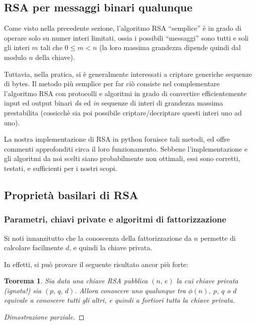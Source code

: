 \documentclass[pdflatex,11pt,a4paper,oneside]{article}
\let\OldEmph\emph
\renewcommand{\emph}[1]{\OldEmph{#1\/}}
\newcommand{\XXX}[1][XXX]{\text{\bfseries{\color{red}{\emph{#1}}}}}
\newcommand{\TODO}[0]{\XXX[TODO]}
\newcommand{\p}[1]{\left({#1}\right)}
\newcommand{\ephi}[1]{\ensuremath{\phi\p{#1}}}
\newtheorem{theorem}[TheoremLike]{Teorema}
\begin{document}
\subsection{RSA per messaggi binari qualunque}

Come visto nella precedente sezione, l'algoritmo RSA ``semplice'' \`e
in grado di operare solo su numer interi limitati, ossia i possibili
``messaggi'' sono tutti e soli gli interi $m$ tali che $0 \leq m < n$
(la loro massima grandezza dipende quindi dal modulo $n$ della chiave).

Tuttavia, nella pratica, si \`e generalmente interessati a criptare
generiche sequenze di bytes.  Il metodo pi\`u semplice per far ci\`o
consiste nel complementare l'algoritmo RSA con protocolli e algoritmi
in grado di convertire efficientemente input ed output binari \emph{da}
ed \emph{in} sequenze di interi di grandezza massima prestabilita
(cossicch\`e sia poi possibile criptare/decriptare questi interi uno
ad uno).

La nostra implementazione di RSA in python fornisce tali metodi, ed
offre commenti approfonditi circa il loro funzionamento. Sebbene
l'implementazione e gli algoritmi da noi scelti siano probabilmente
non ottimali, essi sono corretti, testati, e sufficienti per i nostri
scopi.

\subsection{Propriet\`a basilari di RSA}

\medskip
\subsubsection{Parametri, chiavi private e algoritmi di
               fattorizzazione}\label{subsect:keys-and-factorization}

Si noti innanzitutto che la conoscenza della fattorizzazione da $n$
permette di calcolare facilmente $d$, e quindi la chiave privata.

\medskip\noindent
In effetti, si pu\`o provare il seguente risultato ancor pi\`u forte:
\begin{theorem}
Sia data una chiave RSA pubblica $(n,\, e)$ la cui chiave privata
(ignota!) sia $(p,\, q,\, d)$.  Allora conoscere uno qualunque tra
$\ephi{n}$, $p$, $q$ o $d$ equivale a conoscere tutti gli altri, e
quindi \emph{a fortiori} tutta la chiave privata.
\end{theorem}
%
\begin{proof}[Dimostrazione parziale]
\TODO
\end{proof}
\end{document}
